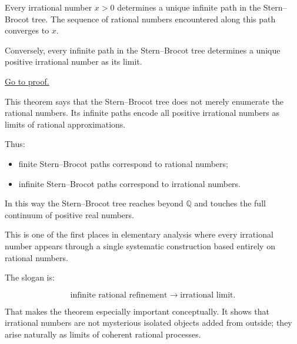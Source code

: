 
\begin{theorem}
\label{thm:stern-brocot-limit}

Every irrational number $x>0$ determines a unique infinite path in the
Stern--Brocot tree.  The sequence of rational numbers encountered along
this path converges to $x$.

Conversely, every infinite path in the Stern--Brocot tree determines a
unique positive irrational number as its limit.

\end{theorem}

\begin{remark*}[Proof]
\hyperref[prf:stern-brocot-limit]{Go to proof.}
\end{remark*}

\begin{remark}[Interpretation]
This theorem says that the Stern--Brocot tree does not merely enumerate
the rational numbers.  Its infinite paths encode all positive irrational
numbers as limits of rational approximations.

Thus:

\begin{itemize}
\item finite Stern--Brocot paths correspond to rational numbers;
\item infinite Stern--Brocot paths correspond to irrational numbers.
\end{itemize}

In this way the Stern--Brocot tree reaches beyond $\mathbb{Q}$ and
touches the full continuum of positive real numbers.
\end{remark}

\begin{remark}
This is one of the first places in elementary analysis where every
irrational number appears through a single systematic construction based
entirely on rational numbers.

The slogan is:

\[
\text{infinite rational refinement} \longrightarrow \text{irrational limit}.
\]

That makes the theorem especially important conceptually.  It shows that
irrational numbers are not mysterious isolated objects added from
outside; they arise naturally as limits of coherent rational processes.
\end{remark}

